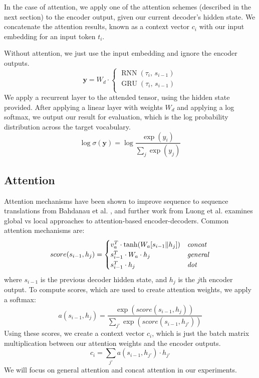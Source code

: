 \documentclass[twoside,twocolumn]{article}
\begin{document}
In the case of attention, we apply one of the attention schemes (described in
the next section) to the encoder output, given our current decoder's
hidden state. We concatenate the attention results, known as a context vector
$c_i$ with our input embedding for an input token $t_i$.

Without attention, we just use the input embedding and ignore the encoder
outputs.
\begin{equation}
  \mathbf{y} = W_d \cdot \begin{cases}
      \operatorname{RNN} (\tau_i, \, s_{i-1}) \\
      \operatorname{GRU} (\tau_i, \, s_{i-1}) \\
    \end{cases}
\end{equation}
We apply a recurrent layer to the attended tensor, using the hidden state
provided. After applying a linear layer with weights $W_d$ and applying a log
softmax, we output our result for evaluation, which is the log probability
distribution across the target vocabulary.
\begin{equation}
  \log \sigma(\mathbf{y}) = \log \frac{\exp(y_i)}{\sum_j \exp(y_j)}
\end{equation}
\subsection{Attention}
Attention mechanisms have been shown to improve sequence to sequence
translations from Bahdanau et al. \cite{bahdanau2014neural}, and further work
from Luong et al. \cite{luong2015effective} examines global vs local approaches
to attention-based encoder-decoders. Common attention mechanisms are:
\begin{equation}
    score(s_{i-1}, h_j) =
    \begin{cases}
        v_a^T \cdot \tanh (W_a [s_{i-1} \| h_j]) & \text{\emph{concat}} \\
        s_{i-1}^T \cdot W_a \cdot h_j & \text{\emph{general}} \\
        s_{i-1}^T \cdot h_j & \text{\emph{dot}} \\
    \end{cases}
\end{equation}
where $s_{i-1}$ is the previous decoder hidden state, and $h_j$ is the $j$th
encoder output.
To compute scores, which are used to create attention weights, we apply a
softmax:
\begin{equation}
  a(s_{i-1}, h_j) = \frac{\exp(score(s_{i-1}, h_j))}{\sum_{j'}\exp(score(s_{i-1}, h_{j'}))}
\end{equation}
Using these scores, we create a context vector $c_i$, which is just the batch
matrix multiplication between our attention weights and the encoder outputs.
\begin{equation}
  c_i = \sum_{j'} a(s_{i-1}, h_{j'}) \cdot h_{j'}
\end{equation}
We will focus on general attention and concat attention in our
experiments.
\end{document}
